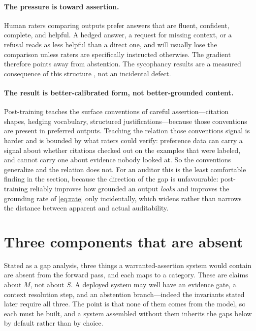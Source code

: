 \paragraph{The pressure is toward assertion.} Human raters comparing outputs
prefer answers that are fluent, confident, complete, and helpful. A hedged answer,
a request for missing context, or a refusal reads as less helpful than a direct
one, and will usually lose the comparison unless raters are specifically
instructed otherwise. The gradient therefore points away from abstention. The
sycophancy results are a measured
consequence of this structure \citep{sharma2024}, not an incidental defect.

\paragraph{The result is better-calibrated form, not better-grounded content.}
Post-training teaches the surface conventions of careful assertion---citation
shapes, hedging vocabulary, structured justifications---because those conventions
are present in preferred outputs. Teaching the relation those conventions signal is
harder and is bounded by what raters could verify: preference data can carry a signal
about whether citations checked out on the examples that were labeled, and cannot
carry one about evidence nobody looked at. So the conventions generalize and the
relation does not. For an auditor this is the least comfortable finding in the section,
because the direction of the gap is unfavourable: post-training reliably improves how
grounded an output \emph{looks} and improves the grounding rate of \eqref{eq:rate}
only incidentally, which widens rather than narrows the distance between apparent and
actual auditability.

\section{Three components that are absent}
\label{sec:missing}

Stated as a gap analysis, three things a warranted-assertion system would contain
are absent from the forward pass, and each maps to a category. These are claims about
$M$, not about $S$. A deployed system may well have an evidence gate, a context
resolution step, and an abstention branch---indeed the
invariants stated later require all three. The point is that none of them comes from the
model, so each must be built, and a system assembled without them inherits the gaps
below by default rather than by choice.

